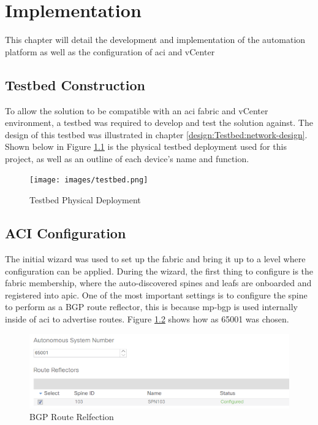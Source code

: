 \chapter{Implementation}
\label{chap:implementation}
This chapter will detail the development and implementation of the automation
platform as well as the configuration of \gls{aci} and vCenter
\section{Testbed Construction}
To allow the solution to be compatible with an \gls{aci} fabric and vCenter environment, a testbed was required to develop and test the solution against. The design of this testbed was illustrated in chapter \ref{design:Testbed:network-design}. Shown below in Figure \ref{fig:testbed} is the physical testbed deployment used for this project, as well as an outline of each device's name and function.

\begin{figure}[H]
    
    \centering
    \texttt{[image: images/testbed.png]}
    
    \caption{Testbed Physical Deployment}
    \label{fig:testbed}
\end{figure}

\section{ACI Configuration}
The initial wizard was used to set up the fabric and bring it up to a level
where configuration can be applied. During the wizard, the first thing to
configure is the fabric membership, where the auto-discovered spines and leafs
are onboarded and registered into \gls{apic}.
One of the most important settings is to configure the spine to perform as a
BGP route reflector, this is because \gls{mp-bgp} is used internally inside of
\gls{aci} to advertise routes. Figure \ref{fig:bgp-reflection} shows how
\gls{as} 65001 was chosen.

\begin{figure}[H]
    
    \centering
    \includegraphics[scale=0.5]{images/bgp-reflection.png}
    
    \caption{BGP Route Relfection}
    \label{fig:bgp-reflection}
\end{figure}


